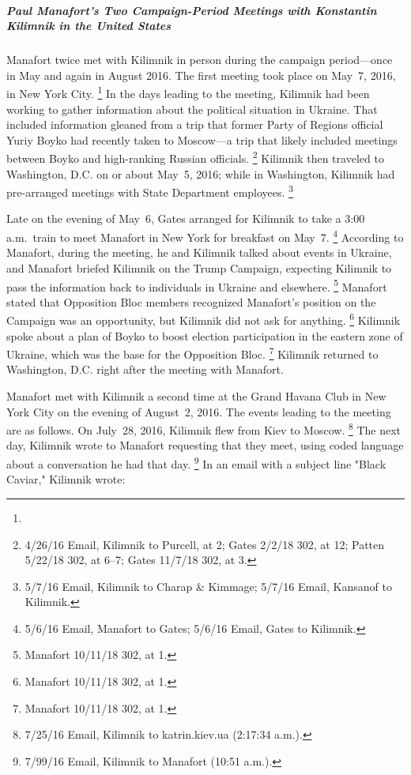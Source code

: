 \subparagraph{Paul Manafort's Two Campaign-Period Meetings with Konstantin Kilimnik in the United States}

Manafort twice met with Kilimnik in person during the campaign period---once in May and again in August 2016.
The first meeting took place on May~7, 2016, in New York City.%
\footnote{}
In the days leading to the meeting, Kilimnik had been working to gather information about the political situation in Ukraine.
That included information gleaned from a trip that former Party of Regions official Yuriy Boyko had recently taken to Moscow---a trip that likely included meetings between Boyko and high-ranking Russian officials.%
\footnote{4/26/16 Email, Kilimnik to Purcell, at 2;
Gates 2/2/18 302, at 12;
Patten 5/22/18 302, at 6--7;
Gates 11/7/18 302, at 3.}
Kilimnik then traveled to Washington, D.C. on or about May~5, 2016; while in Washington, Kilimnik had pre-arranged meetings with State Department employees.%
\footnote{5/7/16 Email, Kilimnik to Charap \& Kimmage;
5/7/16 Email, Kansanof to Kilimnik.}

Late on the evening of May~6, Gates arranged for Kilimnik to take a 3:00 a.m.\ train to meet Manafort in New York for breakfast on May~7.%
\footnote{5/6/16 Email, Manafort to Gates;
5/6/16 Email, Gates to Kilimnik.}
According to Manafort, during the meeting, he and Kilimnik talked about events in Ukraine, and Manafort briefed Kilimnik on the Trump Campaign, expecting Kilimnik to pass the information back to individuals in Ukraine and elsewhere.%
\footnote{Manafort 10/11/18 302, at 1.}
Manafort stated that Opposition Bloc members recognized Manafort's position on the Campaign was an opportunity, but Kilimnik did not ask for anything.%
\footnote{Manafort 10/11/18 302, at 1.}
Kilimnik spoke about a plan of Boyko to boost election participation in the eastern zone of Ukraine, which was the base for the Opposition Bloc.%
\footnote{Manafort 10/11/18 302, at 1.}
Kilimnik returned to Washington, D.C. right after the meeting with Manafort.

Manafort met with Kilimnik a second time at the Grand Havana Club in New York City on the evening of August~2, 2016.
The events leading to the meeting are as follows.
On July~28, 2016, Kilimnik flew from Kiev to Moscow.%
\footnote{7/25/16 Email, Kilimnik to katrin\@yana.kiev.ua (2:17:34 a.m.).}
The next day, Kilimnik wrote to Manafort requesting that they meet, using coded language about a conversation he had that day.%
\footnote{7/99/16 Email, Kilimnik to Manafort (10:51 a.m.).}
In an email with a subject line "Black Caviar," Kilimnik wrote:

